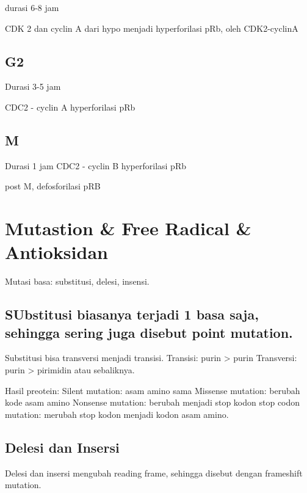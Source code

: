 \documentclass[
  letterpaper,
  DIV=11,
  numbers=noendperiod]{scrreprt}
\begin{document}
durasi 6-8 jam

CDK 2 dan cyclin A dari hypo menjadi hyperforilasi pRb, oleh
CDK2-cyclinA

\subsection{G2}\label{g2}

Durasi 3-5 jam

CDC2 - cyclin A hyperforilasi pRb

\subsection{M}\label{m}

Durasi 1 jam CDC2 - cyclin B hyperforilasi pRb

post M, defosforilasi pRB

\section{Mutastion \& Free Radical \&
Antioksidan}\label{mutastion-free-radical-antioksidan}

Mutasi basa: substitusi, delesi, insensi.

\subsection{SUbstitusi biasanya terjadi 1 basa saja, sehingga sering
juga disebut point
mutation.}\label{substitusi-biasanya-terjadi-1-basa-saja-sehingga-sering-juga-disebut-point-mutation.}

Substitusi bisa transversi menjadi transisi. Transisi: purin
\textgreater{} purin Transversi: purin \textgreater{} pirimidin atau
sebaliknya.

Hasil preotein: Silent mutation: asam amino sama Missense mutation:
berubah kode asam amino Nonsense mutation: berubah menjadi stop kodon
stop codon mutation: merubah stop kodon menjadi kodon asam amino.

\subsection{Delesi dan Insersi}\label{delesi-dan-insersi}

Delesi dan insersi mengubah reading frame, sehingga disebut dengan
frameshift mutation.

\subsection{}\label{section-1}
\end{document}
